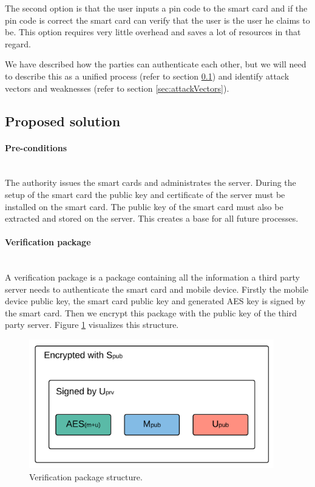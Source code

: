 The second option is that the user inputs a pin code to the smart card and if the pin code is correct the smart card can verify that the user is the user he claims to be. This option requires very little overhead and saves a lot of resources in that regard.

We have described how the parties can authenticate each other, but we will need to describe this as a unified process (refer to section \ref{sec:proposedSolution}) and identify attack vectors and weaknesses (refer to section \ref{sec:attackVectors}).

\subsection{Proposed solution}
\label{sec:proposedSolution}

\paragraph{Pre-conditions}\mbox{}\\
The authority issues the smart cards and administrates the server. During the setup of the smart card the public key and certificate of the server must be installed on the smart card. The public key of the smart card must also be extracted and stored on the server. This creates a base for all future processes.

\paragraph{Verification package}\mbox{}\\
A verification package is a package containing all the information a third party server needs to authenticate the smart card and mobile device. Firstly the mobile device public key, the smart card public key and generated AES key is signed by the smart card. Then we encrypt this package with the public key of the third party server. Figure \ref{fig:h0} visualizes this structure.

\newpage

\begin{figure}[h!]
  \caption{Verification package structure.}
  \label{fig:h0}
  \centering
    \includegraphics[width=0.95\textwidth]{images/H0.png}
\end{figure}

